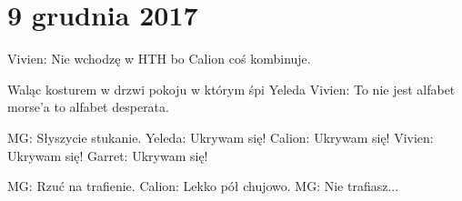 \documentclass[10pt,twoside,twocolumn]{book}
\begin{document}
\section*{9 grudnia 2017}

%    
%       
Vivien: Nie wchodzę w HTH bo Calion coś kombinuje.

%    
%       
Waląc kosturem w drzwi pokoju w którym śpi Yeleda
Vivien: To nie jest alfabet morse'a to alfabet desperata.

%    
%       
MG: Słyszycie stukanie.
Yeleda: Ukrywam się!
Calion: Ukrywam się!
Vivien: Ukrywam się! 
Garret: Ukrywam się!

%    
%       
MG: Rzuć na trafienie.
Calion: Lekko pół chujowo.
MG: Nie trafiasz...
\end{document}
